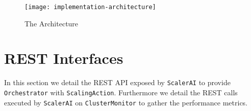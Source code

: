 \begin{figure}	
	\label{fig:implementation-architecture}
	\centering
	\texttt{[image: implementation-architecture]}
	\caption{The Architecture}
\end{figure}


\section{REST Interfaces}
\label{sec:implementation-rest-interfaces}

In this section we detail the REST API exposed by \texttt{ScalerAI} to provide \texttt{Orchestrator} with \texttt{ScalingAction}. Furthermore we detail the REST calls executed by \texttt{ScalerAI} on \texttt{ClusterMonitor} to gather the performance metrics.




